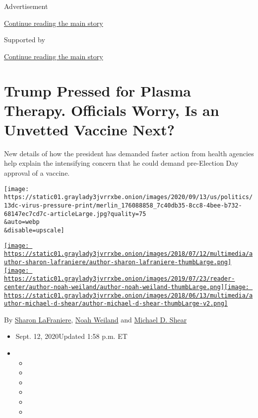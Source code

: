 Advertisement

\protect\hyperlink{after-top}{Continue reading the main story}

Supported by

\protect\hyperlink{after-sponsor}{Continue reading the main story}

\hypertarget{trump-pressed-for-plasma-therapy-officials-worry-is-an-unvetted-vaccine-next}{%
\section{Trump Pressed for Plasma Therapy. Officials Worry, Is an
Unvetted Vaccine
Next?}\label{trump-pressed-for-plasma-therapy-officials-worry-is-an-unvetted-vaccine-next}}

New details of how the president has demanded faster action from health
agencies help explain the intensifying concern that he could demand
pre-Election Day approval of a vaccine.

\texttt{[image: https://static01.graylady3jvrrxbe.onion/images/2020/09/13/us/politics/13dc-virus-pressure-print/merlin\_176088858\_7c40db35-8cc8-4bee-b732-68147ec7cd7c-articleLarge.jpg?quality=75\\\&auto=webp\\\&disable=upscale]}

\href{https://www.nytimes3xbfgragh.onion/by/sharon-lafraniere}{\texttt{[image: https://static01.graylady3jvrrxbe.onion/images/2018/07/12/multimedia/author-sharon-lafraniere/author-sharon-lafraniere-thumbLarge.png]}}\href{https://www.nytimes3xbfgragh.onion/by/noah-weiland}{\texttt{[image: https://static01.graylady3jvrrxbe.onion/images/2019/07/23/reader-center/author-noah-weiland/author-noah-weiland-thumbLarge.png]}}\href{https://www.nytimes3xbfgragh.onion/by/michael-d-shear}{\texttt{[image: https://static01.graylady3jvrrxbe.onion/images/2018/06/13/multimedia/author-michael-d-shear/author-michael-d-shear-thumbLarge-v2.png]}}

By \href{https://www.nytimes3xbfgragh.onion/by/sharon-lafraniere}{Sharon
LaFraniere},
\href{https://www.nytimes3xbfgragh.onion/by/noah-weiland}{Noah Weiland}
and \href{https://www.nytimes3xbfgragh.onion/by/michael-d-shear}{Michael
D. Shear}

\begin{itemize}
\item
  Sept. 12, 2020Updated 1:58 p.m. ET
\item
  \begin{itemize}
  \item
  \item
  \item
  \item
  \item
  \item
  \end{itemize}
\end{itemize}

